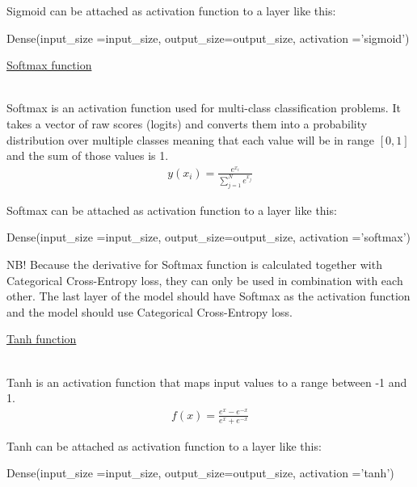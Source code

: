 \documentclass{article}
\begin{document}
    Sigmoid can be attached as activation function to a layer like this:
\begin{python}
Dense(input_size =input_size,
      output_size=output_size,
      activation ='sigmoid')
\end{python}
    \pagebreak

    \hypertarget{softmax}{\underline{Softmax function}} \\

    Softmax is an activation function used for multi-class classification
    problems. It takes a vector of raw scores (logits) and converts 
    them into a probability distribution over multiple classes meaning that 
    each value will be in range $[0, 1]$ and the sum of those values is 1.
    \begin{align*}
        y(x_{i}) = \frac{e^{x_{i}}}{\sum_{j=1}^{N} e^{x_{j}}}
    \end{align*}

    Softmax can be attached as activation function to a layer like this:
    \begin{python}
    Dense(input_size =input_size,
          output_size=output_size,
          activation ='softmax')
    \end{python}
    
    NB! Because the derivative for Softmax function is calculated 
    together with Categorical Cross-Entropy loss, they can only be 
    used in combination with each other. The last layer of the model
    should have Softmax as the activation function and the model should 
    use Categorical Cross-Entropy loss. \\
    \pagebreak

    \hypertarget{tanh}{\underline{Tanh function}} \\

    Tanh is an activation function that maps input values to a range 
    between -1 and 1.
    \begin{align*}
        f(x) = \frac{e^{x} - e^{-x}}{e^{x} + e^{-x}}
    \end{align*}

    \begin{center}    
        \end{center}
    Tanh can be attached as activation function to a layer like this:
\begin{python}
Dense(input_size =input_size,
      output_size=output_size,
      activation ='tanh')
\end{python}
    \clearpage
\end{document}
